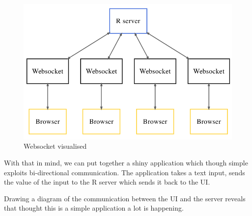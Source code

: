 \documentclass[10pt,]{krantz}
\makeatletter
\newenvironment{Shaded}{\begin{snugshade}}{\end{snugshade}}
\newcommand{\ControlFlowTok}[1]{\textcolor[rgb]{0.27,0.27,0.27}{\textbf{#1}}}
\newcommand{\KeywordTok}[1]{\textcolor[rgb]{0.27,0.27,0.27}{\textbf{#1}}}
\newcommand{\NormalTok}[1]{#1}
\newcommand{\OperatorTok}[1]{\textcolor[rgb]{0.43,0.43,0.43}{\textbf{#1}}}
\newcommand{\StringTok}[1]{\textcolor[rgb]{0.5,0.5,0.5}{#1}}
\newenvironment{kframe}{%
\medskip{}
\setlength{\fboxsep}{.8em}
 \def\at@end@of@kframe{}%
 \ifinner\ifhmode%
  \def\at@end@of@kframe{\end{minipage}}%
  \begin{minipage}{\columnwidth}%
 \fi\fi%
 \def\FrameCommand##1{\hskip\@totalleftmargin \hskip-\fboxsep
 \colorbox{shadecolor}{##1}\hskip-\fboxsep
     \hskip-\linewidth \hskip-\@totalleftmargin \hskip\columnwidth}%
 \MakeFramed {\advance\hsize-\width
   \@totalleftmargin\z@ \linewidth\hsize
   \@setminipage}}%
 {\par\unskip\endMakeFramed%
 \at@end@of@kframe}
\renewenvironment{Shaded}{\begin{kframe}}{\end{kframe}}
\makeatother
\begin{document}
\begin{figure}[H]

{\centering \includegraphics[width=1\linewidth]{images/04-websocket} 

}

\caption{Websocket visualised}\label{fig:unnamed-chunk-2}
\end{figure}

With that in mind, we can put together a shiny application which though simple exploits bi-directional communication. The application takes a text input, sends the value of the input to the R server which sends it back to the UI.

\begin{Shaded}
\end{Shaded}

Drawing a diagram of the communication between the UI and the server reveals that thought this is a simple application a lot is happening.
\end{document}
